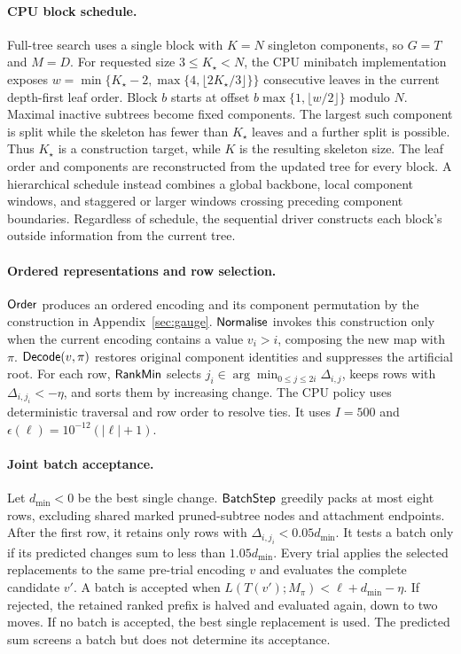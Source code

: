 \paragraph{CPU block schedule.}
Full-tree search uses a single block with $K=N$ singleton components, so $G=T$ and $M=D$.
For requested size $3\leq K_\star<N$, the CPU minibatch implementation exposes
$w=\min\{K_\star-2,\max\{4,\lfloor2K_\star/3\rfloor\}\}$
consecutive leaves in the current depth-first leaf order.
Block $b$ starts at offset $b\max\{1,\lfloor w/2\rfloor\}$ modulo $N$.
Maximal inactive subtrees become fixed components.
The largest such component is split while the skeleton has fewer than $K_\star$ leaves and a further split is possible.
Thus $K_\star$ is a construction target, while $K$ is the resulting skeleton size.
The leaf order and components are reconstructed from the updated tree for every block.
A hierarchical schedule instead combines a global backbone, local component windows, and staggered or larger windows crossing preceding component boundaries.
Regardless of schedule, the sequential driver constructs each block's outside information from the current tree.

\paragraph{Ordered representations and row selection.}
$\mathsf{Order}$ produces an ordered encoding and its component permutation by the construction in Appendix~\ref{sec:gauge}.
$\mathsf{Normalise}$ invokes this construction only when the current encoding contains a value $v_i>i$, composing the new map with $\pi$.
$\mathsf{Decode}(v,\pi)$ restores original component identities and suppresses the artificial root.
For each row, $\mathsf{RankMin}$ selects
$j_i\in\arg\min_{0\leq j\leq2i}\Delta_{i,j}$,
keeps rows with $\Delta_{i,j_i}<-\eta$, and sorts them by increasing change.
The CPU policy uses deterministic traversal and row order to resolve ties.
It uses $I=500$ and $\epsilon(\ell)=10^{-12}(|\ell|+1)$.

\paragraph{Joint batch acceptance.}
Let $d_{\min}<0$ be the best single change.
$\mathsf{BatchStep}$ greedily packs at most eight rows, excluding shared marked pruned-subtree nodes and attachment endpoints.
After the first row, it retains only rows with $\Delta_{i,j_i}<0.05d_{\min}$.
It tests a batch only if its predicted changes sum to less than $1.05d_{\min}$.
Every trial applies the selected replacements to the same pre-trial encoding $v$ and evaluates the complete candidate $v'$.
A batch is accepted when
$L(T(v');M_\pi)<\ell+d_{\min}-\eta$.
If rejected, the retained ranked prefix is halved and evaluated again, down to two moves.
If no batch is accepted, the best single replacement is used.
The predicted sum screens a batch but does not determine its acceptance.

